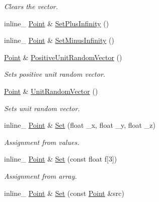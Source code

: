 \begin{DoxyCompactItemize}
\begin{DoxyCompactList}\small\item\em Clears the vector. \end{DoxyCompactList}\item 
inline\+\_\+ \hyperlink{classOpcode_1_1Point}{Point} \& \hyperlink{classOpcode_1_1Point_a363357276cedf74885948fd0196ce561}{Set\+Plus\+Infinity} ()
\item 
inline\+\_\+ \hyperlink{classOpcode_1_1Point}{Point} \& \hyperlink{classOpcode_1_1Point_a530e19ecd864e9f97ab770ab360961ad}{Set\+Minus\+Infinity} ()
\item 
\hyperlink{classOpcode_1_1Point}{Point} \& \hyperlink{classOpcode_1_1Point_a0573b429de6f38d4c708468c965224b3}{Positive\+Unit\+Random\+Vector} ()
\begin{DoxyCompactList}\small\item\em Sets positive unit random vector. \end{DoxyCompactList}\item 
\hyperlink{classOpcode_1_1Point}{Point} \& \hyperlink{classOpcode_1_1Point_ae54251d03d185249914d51e3213e1081}{Unit\+Random\+Vector} ()
\begin{DoxyCompactList}\small\item\em Sets unit random vector. \end{DoxyCompactList}\item 
inline\+\_\+ \hyperlink{classOpcode_1_1Point}{Point} \& \hyperlink{classOpcode_1_1Point_a319f173a6ad60fc32042f726fa8c257a}{Set} (float \+\_\+x, float \+\_\+y, float \+\_\+z)\hypertarget{classOpcode_1_1Point_a319f173a6ad60fc32042f726fa8c257a}{}\label{classOpcode_1_1Point_a319f173a6ad60fc32042f726fa8c257a}

\begin{DoxyCompactList}\small\item\em Assignment from values. \end{DoxyCompactList}\item 
inline\+\_\+ \hyperlink{classOpcode_1_1Point}{Point} \& \hyperlink{classOpcode_1_1Point_afef6b55821ca26c3aaef44c01c0b9001}{Set} (const float f\mbox{[}3\mbox{]})\hypertarget{classOpcode_1_1Point_afef6b55821ca26c3aaef44c01c0b9001}{}\label{classOpcode_1_1Point_afef6b55821ca26c3aaef44c01c0b9001}

\begin{DoxyCompactList}\small\item\em Assignment from array. \end{DoxyCompactList}\item 
inline\+\_\+ \hyperlink{classOpcode_1_1Point}{Point} \& \hyperlink{classOpcode_1_1Point_a3d55f5ae1f5a75e469f8e74f798b70c1}{Set} (const \hyperlink{classOpcode_1_1Point}{Point} \&src)\hypertarget{classOpcode_1_1Point_a3d55f5ae1f5a75e469f8e74f798b70c1}{}\label{classOpcode_1_1Point_a3d55f5ae1f5a75e469f8e74f798b70c1}


\end{DoxyCompactItemize}
